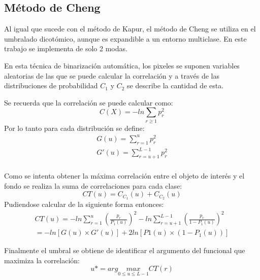 \subsection*{Método de Cheng}
	\hfill\break
	\justifying
	Al igual que sucede con el método de Kapur, el método de Cheng se utiliza en el umbralado dicotómico, aunque es expandible a un entorno multiclase. En este trabajo se implementa de solo 2 modas.
	
	\hfill\break
	\justifying
	En esta técnica de binarización automática, los pixeles se suponen variables aleatorias de las que se puede calcular la correlación y a través de las distribuciones de probabilidad $C_1$ y $C_2$ se describe la cantidad de esta.
	
	\hfill\break
	\justifying
	Se recuerda que la correlación se puede calcular como:
	\begin{equation*}
		C(X) = -ln\sum_{r\geq1} p_r^2
	\end{equation*}
	Por lo tanto para cada distribución se define:
	\begin{equation*}
		\begin{aligned}
			G(u) = \sum_{r=1}^{u} p_r^2 \\
			G'(u) = \sum_{r=u+1}^{L-1} p_r^2 \\
		\end{aligned}
	\end{equation*}
	
	\hfill\break
	\justifying
	Como se intenta obtener la máxima correlación entre el objeto de interés y el fondo se realiza la suma de correlaciones para cada clase:
	\begin{equation*}
		CT(u) = C_{C_1}(u) + C_{C_2}(u)
	\end{equation*}
	Pudiendose calcular de la siguiente forma entonces:
	{\Large \begin{equation*}
		\begin{aligned}
			CT(u) = -ln\sum_{r=1}^{u} \left( \frac{p_r}{P_1(u)} \right)^2 -ln\sum_{r=u+1}^{L-1} \left( \frac{p_r}{1-P_1(u)} \right)^2 \\ = -ln[G(u)\times G'(u)]+2ln[P1(u)\times(1-P_1(u))]
		\end{aligned}
	\end{equation*}}
	
	\hfill\break
	\justifying
	Finalmente el umbral se obtiene de identificar el argumento del funcional que maximiza la correlación:
	{\Large \begin{equation*}
		u* = arg \underset{0\leq u \leq L-1}{max} CT(r)
	\end{equation*}}
	
